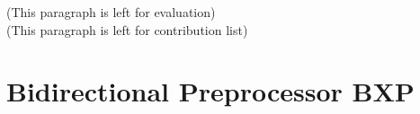 \documentclass[11pt]{article}
\theoremstyle{theorem}
\theoremstyle{lemma}
\theoremstyle{property}
\theoremstyle{definition}
\theoremstyle{assumption}
\begin{document}
(This paragraph is left for evaluation)
\\

(This paragraph is left for contribution list)
\\

\section{Bidirectional Preprocessor BXP}

\end{document}
